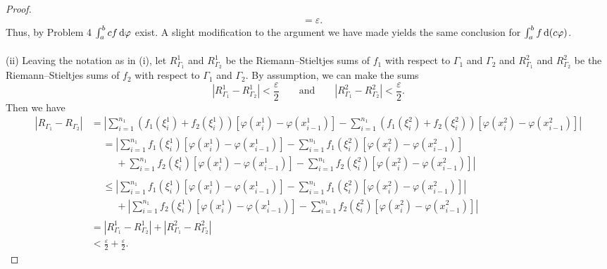 \begin{proof}
\begin{align*}
    &=\varepsilon.
  \end{align*}
  Thus, by Problem 4 $\int_a^b cf\mathop{}\!\mathrm{d}\varphi$ exist. A slight modification
  to the argument we have made yields the same conclusion for
  $\int_a^b f\mathop{}\!\mathrm{d}(c\varphi)$.
  \\\\
  (ii) Leaving the notation as in (i), let $R_{\Gamma_1}^1$ and
  $R_{\Gamma_2}^1$ be the Riemann--Stieltjes sums of $f_1$ with respect to
  $\Gamma_1$ and $\Gamma_2$ and $R_{\Gamma_1}^2$ and $R_{\Gamma_2}^2$ be
  the Riemann--Stieltjes sums of $f_2$ with respect to $\Gamma_1$ and
  $\Gamma_2$. By assumption, we can make the sums
  \[
    |R_{\Gamma_1}^1-R_{\Gamma_2}^1|<\frac{\varepsilon}{2}
    \qquad\text{and}\qquad
    |R_{\Gamma_1}^2-R_{\Gamma_2}^2|<\frac{\varepsilon}{2}.
  \]
  Then we have
  \begin{align*}
    |R_{\Gamma_1}-R_{\Gamma_2}|
    &{}={}\left|
      \sum_{i=1}^{n_1}(f_1(\xi_i^1)+f_2(\xi_i^1))
      \left[\varphi(x_i^1)-\varphi(x_{i-1}^1)\right]
      -\sum_{i=1}^{n_1}(f_1(\xi_i^2)+f_2(\xi_i^2))
      \left[\varphi(x_i^2)-\varphi(x_{i-1}^2)\right]
      \right|\\
    {}&{}\begin{aligned}
      &=\left|\sum_{i=1}^{n_1}f_1(\xi_i^1)
        \left[\varphi(x_i^1)-\varphi(x_{i-1}^1)\right]
        -\sum_{i=1}^{n_1}f_1(\xi_i^2)
        \left[\varphi(x_i^2)-\varphi(x_{i-1}^2)
        \right]\right.\\
      &\phantom{{}={}}+\left. \sum_{i=1}^{n_1}f_2(\xi_i^1)
        \left[\varphi(x_i^1)-\varphi(x_{i-1}^1)\right]
        -\sum_{i=1}^{n_1}f_2(\xi_i^2)
        \left[\varphi(x_i^2)-\varphi(x_{i-1}^2) \right] \right|
    \end{aligned}\\
    &\begin{aligned}
      &\leq\left|\sum_{i=1}^{n_1}f_1(\xi_i^1)
        \left[\varphi(x_i^1)-\varphi(x_{i-1}^1)\right]
        -\sum_{i=1}^{n_1}f_1(\xi_i^2)
        \left[\varphi(x_i^2)-\varphi(x_{i-1}^2)
        \right]\right|\\
      &\phantom{{}={}}+\left|\sum_{i=1}^{n_1}f_2(\xi_i^1)
        \left[\varphi(x_i^1)-\varphi(x_{i-1}^1)\right]
        -\sum_{i=1}^{n_1}f_2(\xi_i^2)
        \left[\varphi(x_i^2)-\varphi(x_{i-1}^2) \right] \right|
    \end{aligned}\\
    &{}={}|R_{\Gamma_1}^1-R_{\Gamma_2}^1|+|R_{\Gamma_1}^2-R_{\Gamma_2}^2|\\
    &{}<{}\frac{\varepsilon}{2}+\frac{\varepsilon}{2}.

\end{align*}
\end{proof}
